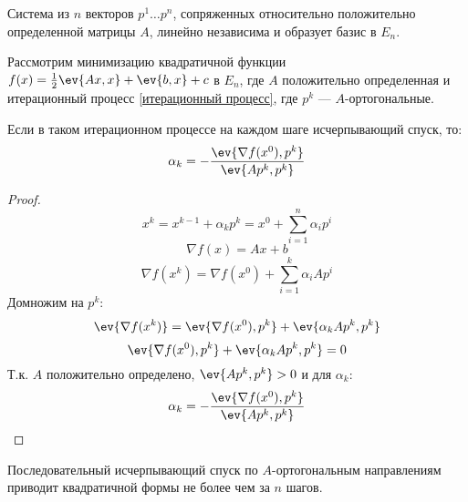 Система из \(n\) векторов \(p^1 \dots p^n\), сопряженных относительно положительно определенной матрицы \(A\), линейно независима и образует базис в \(E_n\).

Рассмотрим минимизацию квадратичной функции \(f(x) = \frac{1}{2} \ev{Ax, x} + \ev{b, x} + c\) в \(E_n\), где \(A\) положительно определенная и итерационный процесс \eqref{итерационный процесс}, где \(p^k\) --- \(A\)-ортогональные.

Если в таком итерационном процессе на каждом шаге исчерпывающий спуск, то:
\[\alpha_k = -\frac{\ev{\nabla f(x^0), p^k}}{\ev{A p^k, p^k}} \]

\begin{proof}
    \[x^k = x^{k - 1} + \alpha_k p^k = x^0 + \sum_{i = 1}^n \alpha_i p^i\]
    \[\nabla f(x) = Ax + b\]
    \[\nabla f(x^k) = \nabla f(x^0) + \sum_{i = 1}^k \alpha_i A p^i\]
    Домножим на \(p^k\):
    \[\ev{\nabla f(x^k)} = \ev{\nabla f(x^0), p^k} + \ev{\alpha_k A p^k, p^k} \]
    \[\ev{\nabla f(x^0), p^k} + \ev{\alpha_k A p^k, p^k} = 0\]
    Т.к. \(A\) положительно определено, \(\ev{A p^k, p^k} > 0\) и для \(\alpha_k\):
    \[\alpha_k = -\frac{\ev{\nabla f(x^0), p^k}}{\ev{A p^k, p^k}} \]
\end{proof}

\begin{theorem}
    Последовательный исчерпывающий спуск по \(A\)-ортогональным направлениям приводит квадратичной формы не более чем за \(n\) шагов.
\end{theorem}
